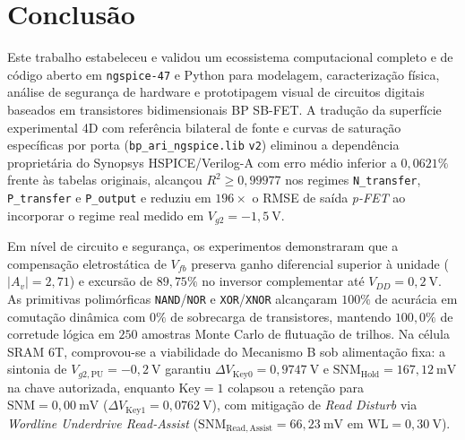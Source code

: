 \section{Conclus\~{a}o}\label{sec:conclusao}

Este trabalho estabeleceu e validou um ecossistema computacional completo e de c\'{o}digo aberto em \texttt{ngspice-47} e Python para modelagem, caracteriza\c{c}\~{a}o f\'{i}sica, an\'{a}lise de seguran\c{c}a de hardware e prototipagem visual de circuitos digitais baseados em transistores bidimensionais BP SB-FET. A tradu\c{c}\~{a}o da superf\'{i}cie experimental 4D com refer\^{e}ncia bilateral de fonte e curvas de satura\c{c}\~{a}o espec\'{i}ficas por porta (\texttt{bp\_ari\_ngspice.lib} \texttt{v2}) eliminou a depend\^{e}ncia propriet\'{a}ria do Synopsys HSPICE/Verilog-A com erro m\'{e}dio inferior a $0{,}0621\%$ frente \`{a}s tabelas originais, alcan\c{c}ou $R^2 \ge 0{,}99977$ nos regimes \texttt{N\_transfer}, \texttt{P\_transfer} e \texttt{P\_output} e reduziu em $196\times$ o RMSE de sa\'{i}da \textit{p-FET} ao incorporar o regime real medido em $V_{g2} = -1{,}5\ \text{V}$.

Em n\'{i}vel de circuito e seguran\c{c}a, os experimentos demonstraram que a compensa\c{c}\~{a}o eletrost\'{a}tica de $V_{fb}$ preserva ganho diferencial superior \`{a} unidade ($|A_v| = 2{,}71$) e excurs\~{a}o de $89{,}75\%$ no inversor complementar at\'{e} $V_{DD} = 0{,}2\ \text{V}$. As primitivas polim\'{o}rficas \texttt{NAND}/\texttt{NOR} e \texttt{XOR}/\texttt{XNOR} alcan\c{c}aram $100\%$ de acur\'{a}cia em comuta\c{c}\~{a}o din\^{a}mica com $0\%$ de sobrecarga de transistores, mantendo $100{,}0\%$ de corretude l\'{o}gica em $250$ amostras Monte Carlo de flutua\c{c}\~{a}o de trilhos. Na c\'{e}lula SRAM 6T, comprovou-se a viabilidade do Mecanismo B sob alimenta\c{c}\~{a}o fixa: a sintonia de $V_{g2,\mathrm{PU}} = -0{,}2\ \text{V}$ garantiu $\Delta V_{\mathrm{Key0}} = 0{,}9747\ \text{V}$ e $\mathrm{SNM}_{\mathrm{Hold}} = 167{,}12\ \text{mV}$ na chave autorizada, enquanto $\text{Key}=1$ colapsou a reten\c{c}\~{a}o para $\mathrm{SNM} = 0{,}00\ \text{mV}$ ($\Delta V_{\mathrm{Key1}} = 0{,}0762\ \text{V}$), com mitiga\c{c}\~{a}o de \textit{Read Disturb} via \textit{Wordline Underdrive Read-Assist} ($\mathrm{SNM}_{\mathrm{Read,Assist}} = 66{,}23\ \text{mV}$ em $\mathrm{WL}=0{,}30\ \text{V}$).

